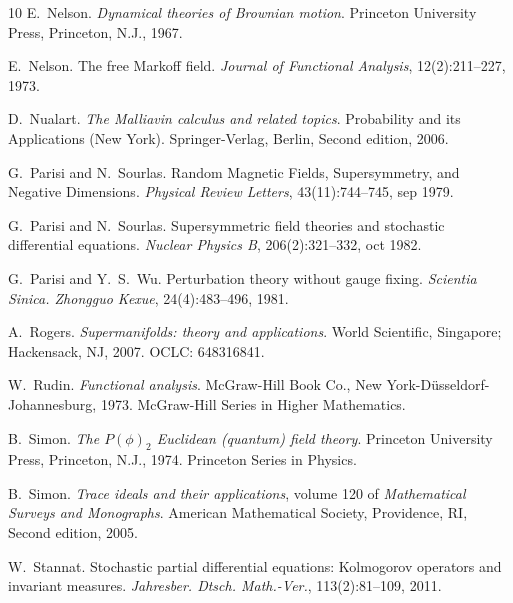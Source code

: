 \documentclass[a4paper,10pt]{article}
\newcommand{\tmtextit}[1]{{\itshape{#1}}}
\begin{document}
\begin{thebibliography}{10}
  E.~Nelson. {\newblock}\tmtextit{Dynamical theories of
  Brownian motion}. {\newblock}Princeton University Press, Princeton, N.J.,
  1967.{\newblock}
  
  E.~Nelson. {\newblock}The free {M}arkoff field.
  {\newblock}\tmtextit{Journal of Functional Analysis}, 12(2):211--227,
  1973.{\newblock}
  
  D.~Nualart. {\newblock}\tmtextit{The Malliavin
  calculus and related topics}. {\newblock}Probability and its Applications
  (New York). Springer-Verlag, Berlin, Second  edition, 2006.{\newblock}
  
  G.~Parisi  and  N.~Sourlas.
  {\newblock}Random Magnetic Fields, Supersymmetry, and Negative Dimensions.
  {\newblock}\tmtextit{Physical Review Letters}, 43(11):744--745, sep
  1979.{\newblock}
  
  G.~Parisi  and  N.~Sourlas.
  {\newblock}Supersymmetric field theories and stochastic differential
  equations. {\newblock}\tmtextit{Nuclear Physics B}, 206(2):321--332, oct
  1982.{\newblock}
  
  G.~Parisi  and  Y.~S.~Wu.
  {\newblock}Perturbation theory without gauge fixing.
  {\newblock}\tmtextit{Scientia Sinica. Zhongguo Kexue}, 24(4):483--496,
  1981.{\newblock}
  
  A.~Rogers.
  {\newblock}\tmtextit{Supermanifolds: theory and applications}.
  {\newblock}World Scientific, Singapore; Hackensack, NJ, 2007.
  {\newblock}OCLC: 648316841.{\newblock}
  
  W.~Rudin. {\newblock}\tmtextit{Functional analysis}.
  {\newblock}McGraw-Hill Book Co., New York-D{\"u}sseldorf-Johannesburg, 1973.
  {\newblock}McGraw-Hill Series in Higher Mathematics.{\newblock}
  
  B.~Simon. {\newblock}\tmtextit{The $P (\phi)_2$
  Euclidean (quantum) field theory}. {\newblock}Princeton University Press,
  Princeton, N.J., 1974. {\newblock}Princeton Series in Physics.{\newblock}
  
  B.~Simon. {\newblock}\tmtextit{Trace ideals and their
  applications},  volume  120  of \tmtextit{Mathematical Surveys and
  Monographs}. {\newblock}American Mathematical Society, Providence, RI,
  Second  edition, 2005.{\newblock}
  
  W.~Stannat. {\newblock}Stochastic partial
  differential equations: Kolmogorov operators and invariant measures.
  {\newblock}\tmtextit{Jahresber. Dtsch. Math.-Ver.}, 113(2):81--109,
  2011.{\newblock}
  

\end{thebibliography}
\end{document}
